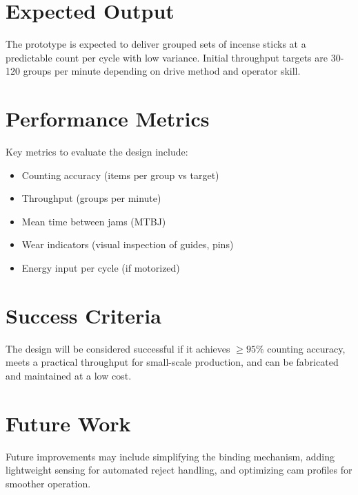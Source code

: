 \section{Expected Output}
The prototype is expected to deliver grouped sets of incense sticks at a predictable count per cycle with low variance. Initial throughput targets are 30-120 groups per minute depending on drive method and operator skill.


\section{Performance Metrics}
Key metrics to evaluate the design include:
\begin{itemize}
	\item Counting accuracy (items per group vs target)
	\item Throughput (groups per minute)
	\item Mean time between jams (MTBJ)
	\item Wear indicators (visual inspection of guides, pins)
	\item Energy input per cycle (if motorized)
\end{itemize}

\section{Success Criteria}
The design will be considered successful if it achieves $\geq 95\%$ counting accuracy, meets a practical throughput for small-scale production, and can be fabricated and maintained at a low cost.

\section{Future Work}
Future improvements may include simplifying the binding mechanism, adding lightweight sensing for automated reject handling, and optimizing cam profiles for smoother operation.